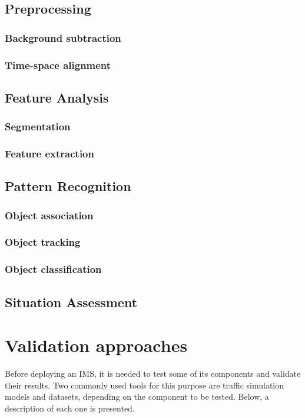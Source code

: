 \subsection{Preprocessing}
\subsubsection{Background subtraction}
\subsubsection{Time-space alignment}
\subsection{Feature Analysis}
\subsubsection{Segmentation}
\subsubsection{Feature extraction}
\subsection{Pattern Recognition}
\subsubsection{Object association}
\subsubsection{Object tracking}
\subsubsection{Object classification}
\subsection{Situation Assessment}

\section{Validation approaches}

Before deploying an IMS, it is needed to test some of its components and validate their results. Two commonly used tools for this purpose are traffic simulation models and datasets, depending on the component to be tested. Below, a description of each one is presented.

